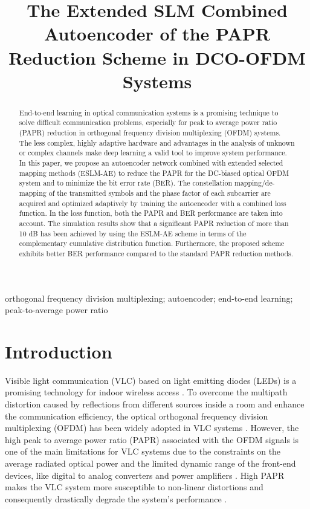 \documentclass[conference]{IEEEtran}
\begin{document}
\title{The Extended SLM Combined Autoencoder of the PAPR Reduction Scheme in DCO-OFDM Systems}

\author{
}

\maketitle

\begin{abstract}
End-to-end learning in optical communication systems is a promising technique to solve difficult communication problems, especially for peak to average power ratio (PAPR) reduction in orthogonal frequency division multiplexing (OFDM) systems. The less complex, highly adaptive hardware and advantages in the analysis of unknown or complex channels make deep learning a valid tool to improve system performance. In this paper, we propose an autoencoder network combined with extended selected mapping methods (ESLM-AE) to reduce the PAPR for the DC-biased optical OFDM system and to minimize the bit error rate (BER). The constellation mapping/de-mapping of the transmitted symbols and the phase factor of each subcarrier are acquired and optimized adaptively by training the autoencoder with a combined loss function. In the loss function, both the PAPR and BER performance are taken into account. The simulation results show that a significant PAPR reduction of more than 10 dB has been achieved by using the ESLM-AE scheme in terms of the complementary cumulative distribution function. Furthermore, the proposed scheme exhibits better BER performance compared to the standard PAPR reduction methods.
\end{abstract}

\begin{IEEEkeywords}
orthogonal frequency division multiplexing; autoencoder; end-to-end learning; peak-to-average power ratio
\end{IEEEkeywords}

\section{Introduction}
Visible light communication (VLC) based on light emitting diodes (LEDs) is a promising technology for indoor wireless access \cite{b1}\cite{b2}\cite{b3}. To overcome the multipath distortion caused by reflections from different sources inside a room and enhance the communication efficiency, the optical orthogonal frequency division multiplexing (OFDM) has been widely adopted in VLC systems \cite{b4}\cite{b5}\cite{b6}\cite{b7}. However, the high peak to average power ratio (PAPR) associated with the OFDM signals is one of the main limitations for VLC systems due to the constraints on the average radiated optical power and the limited dynamic range of the front-end devices, like digital to analog converters and power amplifiers \cite{b8}. High PAPR makes the VLC system more susceptible to non-linear distortions and consequently drastically degrade the system's performance \cite{b9}\cite{b10}\cite{b11}.
\end{document}
